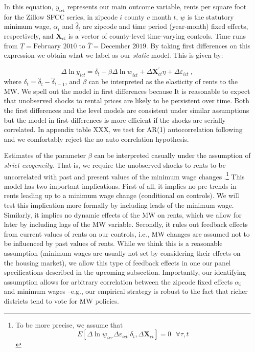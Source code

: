 In this equation, $y_{ict}$ represents our main outcome variable, rents per square foot 
for the Zillow SFCC series, in zipcode $i$ county $c$ month $t$, $\underline{w}$ is the 
statutory minimum wage, $\alpha_i$ and $\hat{\delta}_t$ are zipcode and time period (year-month) 
fixed effects, respectively, and $\mathbf{X}_{ct}$ is a vector of county-level time-varying 
controls. Time runs from $\underline{T} = \text{February 2010}$ to $\overline{T} = 
\text{December 2019}$. By taking first differences on this expression we obtain what 
we label as our \textit{static} model. This is given by:
    
\begin{equation}\label{eq:did}
	\Delta \ln y_{ict} = \delta_t
						+ \beta \Delta \ln \underline{w}_{ict}
						+ \Delta \mathbf{X}^{'}_{ct} \eta
						+ \Delta \varepsilon_{ict} \ ,
\end{equation}
where $\delta_t = \hat{\delta}_t - \hat{\delta}_{t-1}$, and $\beta$ can be interpreted 
as the elasticity of rents to the MW. We spell out the model in first differences because 
It is reasonable to expect that unobserved shocks to rental prices are likely to be persistent over 
time. Both the first differences and the level models are consistent under similar assumptions 
but the model in first differences is more efficient if the shocks are serially correlated. In appendix table XXX, we test for AR(1) autocorrelation following \textcite[][chapter 10]
{wooldridge2010} and we comfortably reject the no auto correlation hypothesis. 

Estimates of the parameter $\beta$ can be interpreted casually under the assumption of
\textit{strict exogeneity}. That is, we require the unobserved shocks to rents to be uncorrelated
with past and present values of the minimum wage changes \parencite[][chapter 10]
{wooldridge2010}.\footnote{To be more precise, we assume that 
	$$E[\Delta \ln \underline{w}_{ic\tau} \Delta \varepsilon_{ict} | \delta_t, \Delta \mathbf{X}_{ct}] = 0
	\ \ \ \forall \tau, t$$}
This model has two important implications. First of all, it implies no pre-trends in 
rents leading up to a minimum wage change (conditional on controls). We will test this 
implication more formally by including leads of the minimum wage. Similarly, it implies no dynamic effects of the MW on rents, which we allow for later by including lags of the 
MW variable. Secondly, it rules out feedback effects from current values of rents 
on our controls, i.e., MW changes are assumed not to be influenced by past values of rents. 
While we think this is a reasonable assumption (minimum wages are usually not set by considering 
their effects on the housing market), we allow this type of feedback effects in one our panel 
specifications described in the upcoming subsection. Importantly, our identifying assumption 
allows for arbitrary correlation between the zipcode fixed effects $\alpha_i$ and minimum wages 
--e.g., our empirical strategy is robust to the fact that richer districts tend to vote for 
MW policies.

